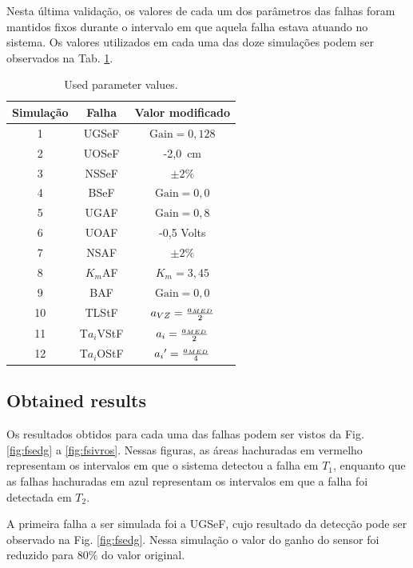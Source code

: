 \documentclass[10pt,fleqn,a4paper]{article}
\begin{document}
Nesta última validação, os valores de cada um dos parâmetros das falhas foram
mantidos fixos durante o intervalo em que aquela falha estava atuando no
sistema. Os valores utilizados em cada uma das doze simulações podem ser
observados na Tab. \ref{tab:used_val}.

\begin{table}[htb]
\centering
\caption{Used parameter values.}
\label{tab:used_val}
\begin{tabular}{|c|c|c|}
\hline
{\bf Simulação} & {\bf Falha} & {\bf Valor modificado}\\
\hline
1 & UGSeF & $\text{Gain} = 0,128$\\
\hline
2 & UOSeF & -2,0\ cm\\
\hline
3 & NSSeF & $\pm 2\%$\\
\hline
4 & BSeF & $\text{Gain} = 0,0$\\
\hline
5 & UGAF & $\text{Gain} = 0,8$\\
\hline
6 & UOAF & -0,5 Volts\\
\hline
7 & NSAF & $\pm 2\%$\\
\hline
8 & $K_m$AF & $K_m = 3,45$\\ 
\hline
9 & BAF & $\text{Gain} = 0,0$\\
\hline
10 & TLStF & $a_{\tiny VZ} = \frac{a_{\tiny MED}}{2}$\\
\hline
11 & T$a_i$VStF & $a_i = \frac{a_{\tiny MED}}{2}$\\
\hline
12 & T$a_i$OStF & ${a_i}' = \frac{a_{\tiny MED}}{4}$\\
\hline
\end{tabular}
\end{table}

\subsection{Obtained results}
Os resultados obtidos para cada uma das falhas podem ser vistos da Fig.
\ref{fig:fsedg} a \ref{fig:fsivros}. Nessas figuras, as áreas hachuradas em
vermelho representam os intervalos em que o sistema detectou a falha em $T_1$,
enquanto que as falhas hachuradas em azul representam os intervalos em que a
falha foi detectada em $T_2$.

A primeira falha a ser simulada foi a UGSeF, cujo resultado da detecção pode ser
observado na Fig. \ref{fig:fsedg}. Nessa simulação o valor do ganho do sensor
foi reduzido para 80\% do valor original. 
\end{document}
